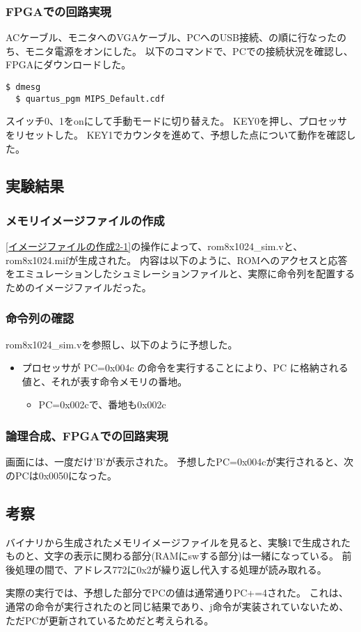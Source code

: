 \subsubsection{FPGAでの回路実現}
ACケーブル、モニタへのVGAケーブル、PCへのUSB接続、の順に行なったのち、モニタ電源をオンにした。
以下のコマンドで、PCでの接続状況を確認し、FPGAにダウンロードした。
\begin{lstlisting}[caption={FPGAでの回路実現},label={FPGAでの回路実現2-1}]
  $ dmesg
  $ quartus_pgm MIPS_Default.cdf
\end{lstlisting}

スイッチ0、1をonにして手動モードに切り替えた。
KEY0を押し、プロセッサをリセットした。
KEY1でカウンタを進めて、予想した点について動作を確認した。

\subsection{実験結果}
\subsubsection{メモリイメージファイルの作成}
\ref{イメージファイルの作成2-1}の操作によって、rom8x1024\_sim.vと、rom8x1024.mifが生成された。
内容は以下のように、ROMへのアクセスと応答をエミュレーションしたシュミレーションファイルと、実際に命令列を配置するためのイメージファイルだった。




\subsubsection{命令列の確認}
rom8x1024\_sim.vを参照し、以下のように予想した。
\begin{itemize}
  \item プロセッサが PC=0x004c の命令を実行することにより、PC に格納される値と、それが表す命令メモリの番地。
  \begin{itemize}
    \item PC=0x002cで、番地も0x002c
  \end{itemize}
\end{itemize}

\subsubsection{論理合成、FPGAでの回路実現}
画面には、一度だけ'B'が表示された。
予想したPC=0x004cが実行されると、次のPCは0x0050になった。

\subsection{考察}
バイナリから生成されたメモリイメージファイルを見ると、実験1で生成されたものと、文字の表示に関わる部分(RAMにswする部分)は一緒になっている。
前後処理の間で、アドレス772に0x2が繰り返し代入する処理が読み取れる。

実際の実行では、予想した部分でPCの値は通常通りPC+=4された。
これは、通常の命令が実行されたのと同じ結果であり、j命令が実装されていないため、ただPCが更新されているためだと考えられる。
